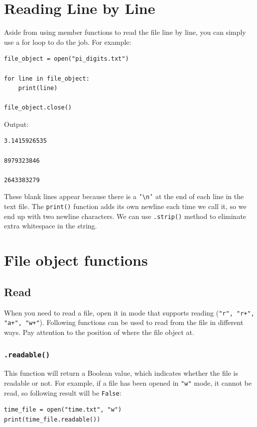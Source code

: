 \documentclass[12pt]{book}
\begin{document}
\section{Reading Line by Line}
\label{sec:orge66bf90}
Aside from using member functions to read the file line by line, you can simply use a for loop to do the job. For example:
\begin{verbatim}
file_object = open("pi_digits.txt")

for line in file_object:
    print(line)

file_object.close()
\end{verbatim}
Output:
\begin{verbatim}
3.1415926535

8979323846

2643383279

\end{verbatim}
These blank lines appear because there is a \texttt{'\textbackslash{}n'} at the end of each line in the text file. The \texttt{print()} function adds its own newline each time we call it, so we end up with two newline characters. We can use \texttt{.strip()} method to eliminate extra whitespace in the string.

\section{File object functions}
\label{sec:org0ec7f1d}
\subsection{Read}
\label{sec:org41c892a}
When you need to read a file, open it in mode that supports reading (\texttt{"r", "r+", "a+", "w+"}). Following functions can be used to read from the file in different ways. Pay attention to the position of where the file object at.
\subsubsection{\texttt{.readable()}}
\label{sec:orgc7122e3}
This function will return a Boolean value, which indicates whether the file is readable or not. For example, if a file has been opened in \texttt{"w"} mode, it cannot be read, so following result will be \texttt{False}:
\begin{verbatim}
time_file = open("time.txt", "w")
print(time_file.readable())
\end{verbatim}
\end{document}
